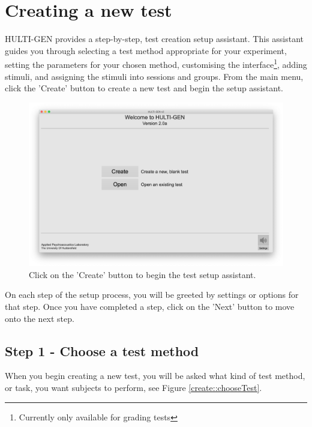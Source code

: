 \chapter{Creating a new test}
HULTI-GEN provides a step-by-step, test creation setup assistant. This assistant guides you through selecting a test method appropriate for your experiment, setting the parameters for your chosen method, customising the interface\footnote{Currently only available for grading tests}, adding stimuli, and assigning the stimuli into sessions and groups.
\newline\newline
From the main menu, click the 'Create' button to create a new test and begin the setup assistant.

\begin{figure}[ht]
	\centering
	\includegraphics[width=1.0\textwidth]{./images/createTest_step01_mainScreen.png}
	\caption{Click on the 'Create' button to begin the test setup assistant.}
	\label{create::mainScreen}
\end{figure}

On each step of the setup process, you will be greeted by settings or options for that step. Once you have completed a step, click on the 'Next' button to move onto the next step.

\pagebreak

\section{Step 1 - Choose a test method}
When you begin creating a new test, you will be asked what kind of test method, or task, you want subjects to perform, see Figure \ref{create::chooseTest}.

